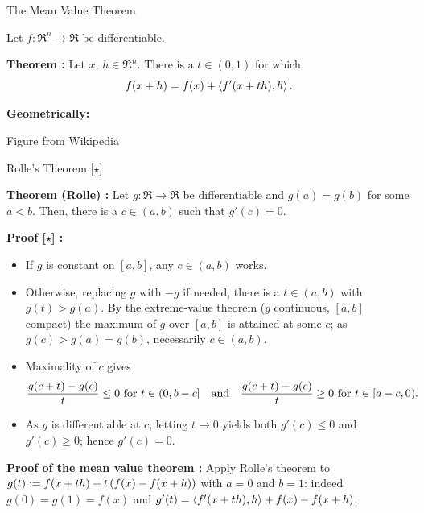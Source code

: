 \documentclass[9pt]{beamer}
\begin{document}
\begin{frame}{The Mean Value Theorem}

  Let $f:\Re^n\to\Re$ be differentiable.

  \vfill
  \textbf{Theorem :} Let $x$, $h\in \Re^n$. There is a $t\in(0, 1)$ for which
  \[
    f(x+h) = f(x) + \left<f'(x+t h),  h\right>.
  \]

  \vfill

  \textbf{Geometrically:}
  \vfill
  
  

  \hfill
  {\tiny Figure from Wikipedia}
  
  
\end{frame}

\begin{frame}{Rolle's Theorem [$\star$]}

  \textbf{Theorem (Rolle) :} Let $g:\Re\to\Re$ be differentiable and $g(a)=g(b)$ for some $a<b$. Then, there is a $c\in (a, b)$ such that $g'(c)=0$.

  \vfill

  \textbf{Proof [$\star$] :}
  \begin{itemize}
  \item If $g$ is constant on $[a, b]$, any $c\in(a, b)$ works.
  \item Otherwise, replacing $g$ with $-g$ if needed, there is a $t\in(a, b)$ with $g(t)>g(a)$. By the extreme-value theorem ($g$ continuous, $[a, b]$ compact) the maximum of $g$ over $[a, b]$ is attained at some $c$; as $g(c)>g(a)=g(b)$, necessarily $c \in (a, b)$.
  \item Maximality of $c$ gives
    \[
      \frac{g(c+t)-g(c)}{t} \leq 0 {\rm{~for~}} t\in(0, b-c] \quad {\rm{and}} \quad \frac{g(c+t)-g(c)}{t} \geq 0 {\rm{~for~}} t \in [a-c, 0).
    \]
  \item As $g$ is differentiable at $c$, letting $t\to 0$ yields both $g'(c)\leq 0$ and $g'(c)\geq 0$; hence $g'(c)=0$.
  \end{itemize}

  \vfill

  \textbf{Proof of the mean value theorem :} Apply Rolle's theorem to $g(t) := f(x+t h)+t\,(f(x)-f(x+h))$ with $a=0$ and $b=1$: indeed $g(0)=g(1)=f(x)$ and $g'(t) = \left<f'(x+t h), h\right> + f(x) - f(x+h)$.

\end{frame}
\end{document}
